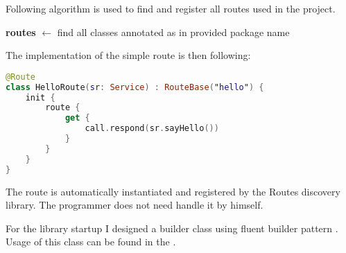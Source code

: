 \medskip \noindent
Following algorithm is used to find and register all routes used in the project.

\begin{algorithm}[H]
	\SetAlgoLined
	\textbf{routes} $\leftarrow$ find all classes annotated as  in provided package name\;
\end{algorithm} 
\medskip \noindent
The implementation of the simple route is then following:

\medskip
\begin{samepage}
\begin{lstlisting}[language=Kotlin]
@Route
class HelloRoute(sr: Service) : RouteBase("hello") {
    init {
        route {
            get {
                call.respond(sr.sayHello())
            }
        }
    }
}
\end{lstlisting}
\end{samepage}

\medskip \noindent
The route is automatically instantiated and registered by the Routes discovery library.
The programmer does not need handle it by himself.

For the library startup I designed a builder class using fluent builder pattern .
Usage of this class can be found in the .